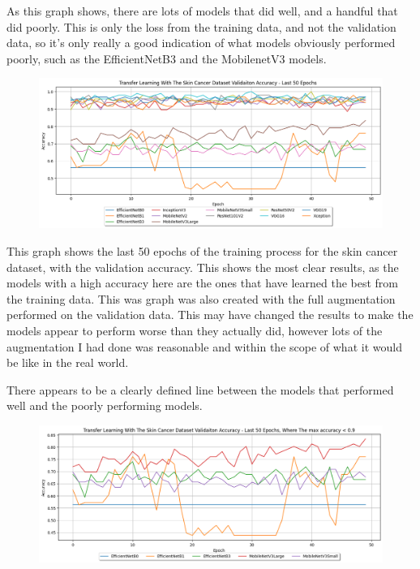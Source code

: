 \documentclass[]{final_report}
\begin{document}
As this graph shows, there are lots of models that did well, and a handful that did poorly. This is only the loss from the training data, and not the validation data, so it's only really a good indication of what models obviously performed poorly, such as the EfficientNetB3 and the MobilenetV3 models.

\pagebreak

\begin{figure}[ht!]
  \centering
  \includegraphics[width=1.1\textwidth]{images/skin-cancer-validation-accuracy-last-50.png}
\end{figure}

This graph shows the last 50 epochs of the training process for the skin cancer dataset, with the validation accuracy. This shows the most clear results, as the models with a high accuracy here are the ones that have learned the best from the training data.
This was graph was also created with the full augmentation performed on the validation data. This may have changed the results to make the models appear to perform worse than they actually did, however lots of the augmentation I had done was reasonable and within the scope of what it would be like in the real world.

There appears to be a clearly defined line between the models that performed well and the poorly performing models.

\begin{figure}[ht!]
  \centering
  \includegraphics[width=1.1\textwidth]{images/Skin-cancer-validation-accuracy-last-50-low-performers.png}
\end{figure}
\end{document}
